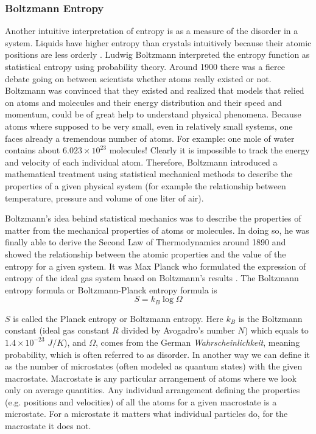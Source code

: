 	\subsubsection{Boltzmann Entropy}
	Another intuitive interpretation of entropy is as a measure of the disorder in a system.  Liquids have higher entropy	than crystals intuitively because their atomic positions are less orderly \cite{Sethna2006}. Ludwig Boltzmann	interpreted the entropy function as statistical entropy using probability theory.	Around 1900 there was a fierce debate going on between scientists whether atoms really existed	or not. Boltzmann was convinced that they existed and realized that models that relied on atoms	and molecules and their energy distribution and their speed and momentum, could be of great	help to understand physical phenomena. Because atoms where supposed to be very small, even	in relatively small systems, one faces already a tremendous number of atoms. For example: one
	mole of water contains about $6.023 \times 10^{23}$ molecules! Clearly it is impossible to track the energy	and velocity of each individual atom. Therefore, Boltzmann introduced a mathematical treatment	using statistical mechanical methods to describe the properties of a given physical system (for example the relationship between temperature, pressure and volume of one liter of air). 
	
	Boltzmann's	idea behind statistical mechanics was to describe the properties of matter from the mechanical	properties of atoms or molecules. In doing so, he was finally able to derive the Second Law of	Thermodynamics around 1890 and showed the relationship between the atomic properties and the	value of the entropy for a given system. It was Max Planck who formulated the expression of entropy of the ideal gas system based on Boltzmann’s results \cite{Schmitz2007}. The Boltzmann entropy formula	or Boltzmann-Planck entropy formula is
	\begin{equation}
		S = k_B \log\Omega
		\label{eqn:boltzmann-entropy}
	\end{equation}

	$S$ is called the Planck entropy or Boltzmann entropy. Here $k_B$ is the Boltzmann constant
	(ideal gas constant $R$ divided by Avogadro's number $N$) which equals to $1.4 \times 10^{-23}$ $J/K$), and $\Omega$, comes from the German \textit{Wahrscheinlichkeit}, meaning probability, which is often referred to as	disorder. In another way we can define it as the number of microstates (often modeled as quantum	states) with the given macrostate. Macrostate is any particular arrangement of atoms where we	look only on average quantities. Any individual arrangement defining the properties (e.g. positions	and velocities) of all the atoms for a given macrostate is a microstate. For a microstate it matters	what individual particles do, for the macrostate it does not.
	
